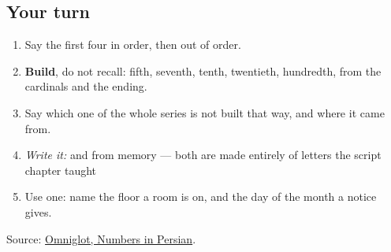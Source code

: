 \subsection*{Your turn}
\begin{enumerate}
\raggedright
  \item Say the first four in order, then out of order.
  \item \textbf{Build}, do not recall: fifth, seventh, tenth, twentieth, hundredth, from the cardinals and the ending.
  \item Say which one of the whole series is not built that way, and where it came from.
  \item \emph{Write it:} \textbf{} and \textbf{} from memory — both are made entirely of letters the script chapter taught
  \item Use one: name the floor a room is on, and the day of the month a notice gives.
\end{enumerate}

\begin{tcolorbox}[breakable,colback=teal!4,colframe=teal!35!black,title={Before you move on}]
Source: \href{https://www.omniglot.com/language/numbers/persian.htm}{Omniglot, Numbers in Persian}.
\end{tcolorbox}
